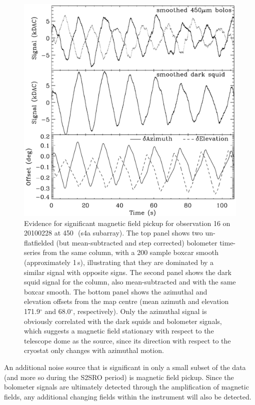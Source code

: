 \documentclass[useAMS,usenatbib,nofootinbib]{mn2e}
\begin{document}
\begin{figure}
\centering
\includegraphics[width=\linewidth]{magpickup}
\caption{Evidence for significant magnetic field pickup for
  observation 16 on 20100228 at 450\,\micron\ (s4a subarray).  The top
  panel shows two un-flatfielded (but mean-subtracted and step
  corrected) bolometer time-series from the same column, with a 200
  sample boxcar smooth (approximately 1\,s), illustrating that they
  are dominated by a similar signal with opposite signs. The second
  panel shows the dark squid signal for the column, also
  mean-subtracted and with the same boxcar smooth. The bottom panel
  shows the azimuthal and elevation offsets from the map centre (mean
  azimuth and elevation 171.9$^\circ$ and 68.0$^\circ$,
  respectively). Only the azimuthal signal is obviously correlated
  with the dark squids and bolometer signals, which suggests a
  magnetic field stationary with respect to the telescope dome as the
  source, since its direction with respect to the cryostat only
  changes with azimuthal motion.}
\label{fig:magpickup}
\end{figure}

An additional noise source that is significant in only a small subset
of the data (and more so during the S2SRO period) is magnetic field
pickup. Since the bolometer signals are ultimately detected through
the amplification of magnetic fields, any additional changing fields
within the instrument will also be detected.
\end{document}
